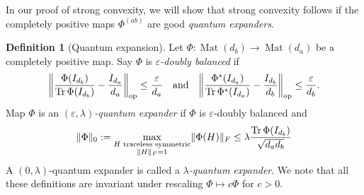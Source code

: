 \documentclass[aos]{imsart}
\theoremstyle{definition}
\newtheorem*{definition}{Definition}
\numberwithin{equation}{section}
\DeclareMathOperator{\op}{op}
\DeclareMathOperator{\Mat}{Mat}
\DeclareMathOperator{\tr}{Tr}
\DeclareMathOperator{\vect}{vec}
\DeclarePairedDelimiter{\norm}{\lVert}{\rVert}
\newcommand{\ot}{\otimes}
\newcommand{\eps}{\varepsilon}
\begin{document}
%
In our proof of strong convexity, we will show that strong convexity follows if the completely positive maps $\Phi^{(ab)}$ are good \emph{quantum expanders}.

\begin{definition}[Quantum expansion]
Let $\Phi\colon\Mat(d_b) \to \Mat(d_a)$ be a completely positive map.
Say $\Phi$ is \emph{$\eps$-doubly balanced} if
\begin{align}\label{eq:doubly balanced}
  \norm*{\frac{\Phi(I_{d_b})}{\tr \Phi(I_{d_b})} - \frac{I_{d_a}}{d_a}}_{\op} \leq \frac\eps{d_a}
\quad\text{and}\quad
  \norm*{\frac{\Phi^*(I_{d_a})}{\tr \Phi^*(I_{d_a})} - \frac{I_{d_b}}{d_b}}_{\op} \leq \frac\eps{d_b}.
\end{align}
Map $\Phi$ is an \emph{$(\eps, \lambda)$-quantum expander} if $\Phi$ is $\eps$-doubly balanced and
\begin{align}\label{eq:expansion}
  \norm{\Phi}_0 := \max_{\substack{H \text{ traceless symmetric} \\ \norm H_F=1}} \norm{\Phi(H)}_F
\leq \lambda \frac{\tr \Phi(I_{d_b})}{\sqrt{d_ad_b}}
\end{align}
A $(0, \lambda)$-quantum expander is called a \emph{$\lambda$-quantum expander}.
We note that all these definitions are invariant under rescaling $\Phi \mapsto c\Phi$ for $c>0$.
\end{definition}
\end{document}
